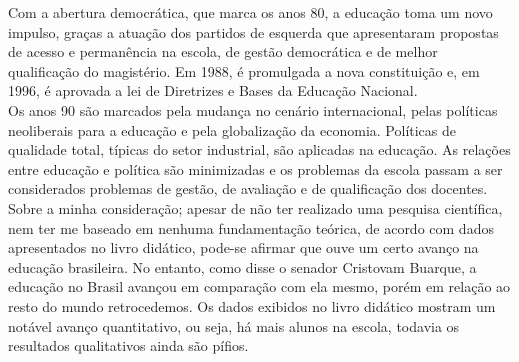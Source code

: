 \documentclass[a4paper, 12pt]{article}
\begin{document}
Com a abertura democrática, que marca os anos 80, a educação toma um novo impulso, graças a atuação dos partidos de esquerda que apresentaram propostas de acesso e permanência na escola, de gestão democrática e de melhor qualificação do magistério. Em 1988, é promulgada a nova constituição e, em 1996, é aprovada a lei de Diretrizes e Bases da Educação Nacional.\\
Os anos 90 são marcados pela mudança no cenário internacional, pelas políticas neoliberais para a educação e pela globalização da economia. Políticas de qualidade total, típicas do setor industrial, são aplicadas na educação. As relações entre educação e política são minimizadas e os problemas da escola passam a ser considerados problemas de gestão, de avaliação e de qualificação dos docentes.\\
Sobre a minha consideração; apesar de não ter realizado uma pesquisa científica, nem ter me baseado em nenhuma fundamentação teórica, de acordo com dados apresentados no livro didático, pode-se afirmar que ouve um certo avanço na educação brasileira. No entanto, como disse o senador Cristovam Buarque, a educação no Brasil avançou em comparação com ela mesmo, porém em relação ao resto do mundo retrocedemos. Os dados exibidos no livro didático mostram um notável avanço quantitativo, ou seja, há mais alunos na escola, todavia os resultados qualitativos ainda são pífios.
\end{document}

